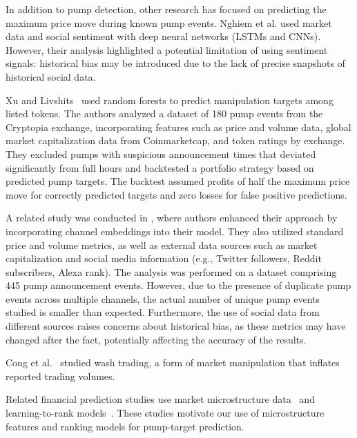 \documentclass{ieeeaccess}
\begin{document}
In addition to pump detection, other research has focused on predicting the maximum price move during known pump events. Nghiem et al. \cite{nghiem_2021} used market data and social sentiment with deep neural networks (LSTMs and \textcolor{revisionblue}{CNNs).} However, their analysis highlighted a potential limitation of using sentiment signals: historical bias may be introduced due to the lack of precise snapshots of historical social data.

\textcolor{revisionblue}{Xu and Livshits~\cite{pd_anatomy} used random forests to predict manipulation targets among listed tokens. The authors analyzed a dataset of 180 pump events from the Cryptopia exchange, incorporating features such as price and volume data, global market capitalization data from Coinmarketcap, and token ratings by exchange. They excluded pumps with suspicious announcement times that deviated significantly from full hours and backtested a portfolio strategy based on predicted pump targets. The backtest assumed profits of half the maximum price move for correctly predicted targets and zero losses for false positive predictions.}

A related study was conducted in \cite{hu2023sequence}, where authors enhanced their approach by incorporating channel embeddings into their model. They also utilized standard price and volume metrics, as well as external data sources such as market capitalization and social media information (e.g., Twitter followers, Reddit subscribers, Alexa rank). The analysis was performed on a dataset comprising 445 pump announcement events. However, due to the presence of duplicate pump events across multiple channels, the actual number of unique pump events studied is smaller than expected. Furthermore, the use of social data from different sources raises concerns about historical bias, as these metrics may have changed after the fact, potentially affecting the accuracy of the results.

\textcolor{revisionblue}{Cong et al.~\cite{cong_washtrading_2023} studied wash trading, a form of market manipulation that inflates reported trading volumes.}

\textcolor{revisionblue}{Related financial prediction studies use market microstructure data~\cite{albers_frag_2022,ntakaris_midprice_2022} and learning-to-rank models~\cite{poh_ltr}. These studies motivate our use of microstructure features and ranking models for pump-target prediction.}
\end{document}
